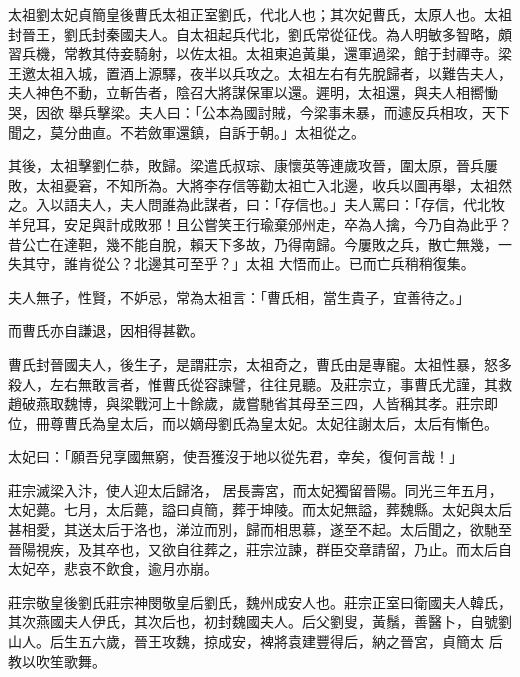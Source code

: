 
\begin{pinyinscope}

 太祖劉太妃貞簡皇後曹氏太祖正室劉氏，代北人也；其次妃曹氏，太原人也。太祖封晉王，劉氏封秦國夫人。自太祖起兵代北，劉氏常從征伐。為人明敏多智略，頗習兵機，常教其侍妾騎射，以佐太祖。太祖東追黃巢，還軍過梁，館于封禪寺。梁王邀太祖入城，置酒上源驛，夜半以兵攻之。太祖左右有先脫歸者，以難告夫人，夫人神色不動，立斬告者，陰召大將謀保軍以還。遲明，太祖還，與夫人相嚮慟哭，因欲
 舉兵擊梁。夫人曰：「公本為國討賊，今梁事未暴，而遽反兵相攻，天下聞之，莫分曲直。不若斂軍還鎮，自訴于朝。」太祖從之。



 其後，太祖擊劉仁恭，敗歸。梁遣氏叔琮、康懷英等連歲攻晉，圍太原，晉兵屢敗，太祖憂窘，不知所為。大將李存信等勸太祖亡入北邊，收兵以圖再舉，太祖然之。入以語夫人，夫人問誰為此謀者，曰：「存信也。」夫人罵曰：「存信，代北牧羊兒耳，安足與計成敗邪！且公嘗笑王行瑜棄邠州走，卒為人擒，今乃自為此乎？昔公亡在達靼，幾不能自脫，賴天下多故，乃得南歸。今屢敗之兵，散亡無幾，一失其守，誰肯從公？北邊其可至乎？」太祖
 大悟而止。已而亡兵稍稍復集。



 夫人無子，性賢，不妒忌，常為太祖言：「曹氏相，當生貴子，宜善待之。」



 而曹氏亦自謙退，因相得甚歡。



 曹氏封晉國夫人，後生子，是謂莊宗，太祖奇之，曹氏由是專寵。太祖性暴，怒多殺人，左右無敢言者，惟曹氏從容諫譬，往往見聽。及莊宗立，事曹氏尤謹，其救趙破燕取魏博，與梁戰河上十餘歲，歲嘗馳省其母至三四，人皆稱其孝。莊宗即位，冊尊曹氏為皇太后，而以嫡母劉氏為皇太妃。太妃往謝太后，太后有慚色。



 太妃曰：「願吾兒享國無窮，使吾獲沒于地以從先君，幸矣，復何言哉！」



 莊宗滅梁入汴，使人迎太后歸洛，
 居長壽宮，而太妃獨留晉陽。同光三年五月，太妃薨。七月，太后薨，謚曰貞簡，葬于坤陵。而太妃無謚，葬魏縣。太妃與太后甚相愛，其送太后于洛也，涕泣而別，歸而相思慕，遂至不起。太后聞之，欲馳至晉陽視疾，及其卒也，又欲自往葬之，莊宗泣諫，群臣交章請留，乃止。而太后自太妃卒，悲哀不飲食，逾月亦崩。



 莊宗敬皇後劉氏莊宗神閔敬皇后劉氏，魏州成安人也。莊宗正室曰衛國夫人韓氏，其次燕國夫人伊氏，其次后也，初封魏國夫人。后父劉叟，黃鬚，善醫卜，自號劉山人。后生五六歲，晉王攻魏，掠成安，裨將袁建豐得后，納之晉宮，貞簡太
 后教以吹笙歌舞。




\end{pinyinscope}
